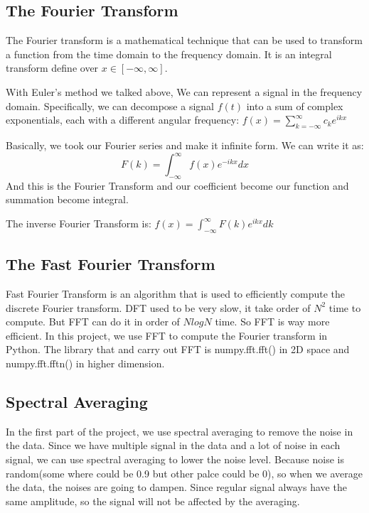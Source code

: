 \documentclass[12pt]{article}%
\begin{document}
\subsection{The Fourier Transform}
The Fourier transform is a mathematical technique that can be used to transform a function from the time domain to the frequency domain. It is an integral transform define over $x \in [-\infty, \infty]$. 

With Euler's method we talked above, We can represent a signal in the frequency domain. Specifically, we can decompose a signal $f(t)$ into a sum of complex exponentials, each with a different angular frequency:
$f(x) = \sum_{k = -\infty}^{\infty} c_k e^{i k x}$

Basically, we took our Fourier series and make it infinite form. We can write it as:
\begin{equation}
    F(k) = \int_{-\infty}^{\infty} f(x)e^{-i k x} dx
\end{equation}
And this is the Fourier Transform and our coefficient become our function and summation become integral. 

The inverse Fourier Transform is:
$f(x)=\int_{-\infty}^{\infty} F(k) e^{i k x} dk$



\subsection{The Fast Fourier Transform}

Fast Fourier Transform is an algorithm that is used to efficiently compute the discrete Fourier transform. DFT used to be very slow, it take order of $N^2$ time to compute. But FFT can do it in order of $NlogN$ time. So FFT is way more efficient. In this project, we use FFT to compute the Fourier transform in Python. The library that and carry out FFT is numpy.fft.fft() in 2D space and numpy.fft.fftn() in higher dimension. 

\subsection{Spectral Averaging}

In the first part of the project, we use spectral averaging to remove the noise in the data. Since we have multiple signal in the data and a lot of noise in each signal, we can use spectral averaging to lower the noise level. Because noise is random(some where could be 0.9 but other palce could be 0), so when we average the data, the noises are going to dampen. Since regular signal always have the same amplitude, so the signal will not be affected by the averaging.
\end{document}
